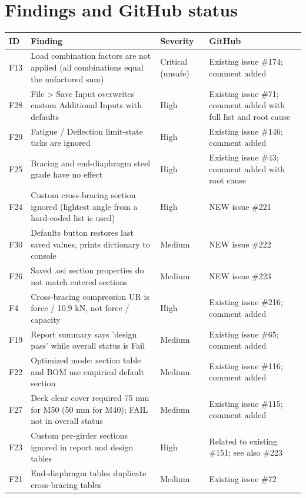 \documentclass[10pt,a4paper]{article}
\begin{document}
\section{Findings and GitHub status}
{\small
\begin{longtable}{|p{1.1cm}|p{12cm}|p{3cm}|p{7cm}|}
\hline \textbf{ID} & \textbf{Finding} & \textbf{Severity} & \textbf{GitHub} \\ \hline \endhead
F13 & Load combination factors are not applied (all combinations equal the unfactored sum) & Critical (unsafe) & Existing issue \#174; comment added \\ \hline
F28 & File > Save Input overwrites custom Additional Inputs with defaults & High & Existing issue \#71; comment added with full list and root cause \\ \hline
F29 & Fatigue / Deflection limit-state ticks are ignored & High & Existing issue \#146; comment added \\ \hline
F25 & Bracing and end-diaphragm steel grade have no effect & High & Existing issue \#43; comment added with root cause \\ \hline
F24 & Custom cross-bracing section ignored (lightest angle from a hard-coded list is used) & High & NEW issue \#221 \\ \hline
F30 & Defaults button restores last saved values, prints dictionary to console & Medium & NEW issue \#222 \\ \hline
F26 & Saved .osi section properties do not match entered sections & Medium & NEW issue \#223 \\ \hline
F4 & Cross-bracing compression UR is force / 10.9 kN, not force / capacity & High & Existing issue \#216; comment added \\ \hline
F19 & Report summary says 'design pass' while overall status is Fail & Medium & Existing issue \#65; comment added \\ \hline
F22 & Optimized mode: section table and BOM use empirical default section & Medium & Existing issue \#116; comment added \\ \hline
F27 & Deck clear cover required 75 mm for M50 (50 mm for M40); FAIL not in overall status & Medium & Existing issue \#115; comment added \\ \hline
F23 & Custom per-girder sections ignored in report and design tables & High & Related to existing \#151; see also \#223 \\ \hline
F21 & End-diaphragm tables duplicate cross-bracing tables & Medium & Existing issue \#72 \\ \hline

\end{longtable}}
\end{document}
